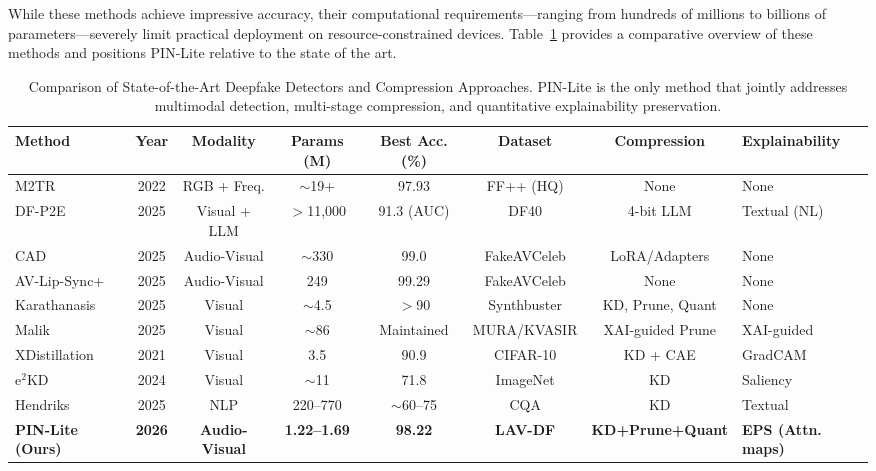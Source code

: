 \documentclass[lettersize,journal]{IEEEtran}
\begin{document}
While these methods achieve impressive accuracy, their computational requirements---ranging from hundreds of millions to billions of parameters---severely limit practical deployment on resource-constrained devices. Table~\ref{tab:literature} provides a comparative overview of these methods and positions PIN-Lite relative to the state of the art.

\begin{table}[!t]
\caption{Comparison of State-of-the-Art Deepfake Detectors and Compression Approaches. PIN-Lite is the only method that jointly addresses multimodal detection, multi-stage compression, and quantitative explainability preservation.\label{tab:literature}}
\centering
\footnotesize
\begin{tabular}{lccccccl}
\toprule
\textbf{Method} & \textbf{Year} & \textbf{Modality} & \textbf{Params (M)} & \textbf{Best Acc. (\%)} & \textbf{Dataset} & \textbf{Compression} & \textbf{Explainability} \\
\midrule
M2TR~\cite{wang2022m2tr} & 2022 & RGB + Freq. & $\sim$19+ & 97.93 & FF++ (HQ) & None & None \\
DF-P2E~\cite{tariq2025dfp2e} & 2025 & Visual + LLM & $>$11{,}000 & 91.3 (AUC) & DF40 & 4-bit LLM & Textual (NL) \\
CAD~\cite{du2025cad} & 2025 & Audio-Visual & $\sim$330 & 99.0 & FakeAVCeleb & LoRA/Adapters & None \\
AV-Lip-Sync+~\cite{shahzad2025avlipsync} & 2025 & Audio-Visual & 249 & 99.29 & FakeAVCeleb & None & None \\
Karathanasis~\cite{karathanasis2025compression} & 2025 & Visual & $\sim$4.5 & $>$90 & Synthbuster & KD, Prune, Quant & None \\
Malik~\cite{malik2025pruning} & 2025 & Visual & $\sim$86 & Maintained & MURA/KVASIR & XAI-guided Prune & XAI-guided \\
XDistillation~\cite{alharbi2021xdistillation} & 2021 & Visual & 3.5 & 90.9 & CIFAR-10 & KD + CAE & GradCAM \\
e$^2$KD~\cite{parchami2024e2kd} & 2024 & Visual & $\sim$11 & 71.8 & ImageNet & KD & Saliency \\
Hendriks~\cite{hendriks2025honey} & 2025 & NLP & 220--770 & $\sim$60--75 & CQA & KD & Textual \\
\midrule
\textbf{PIN-Lite (Ours)} & \textbf{2026} & \textbf{Audio-Visual} & \textbf{1.22--1.69} & \textbf{98.22} & \textbf{LAV-DF} & \textbf{KD+Prune+Quant} & \textbf{EPS (Attn. maps)} \\
\bottomrule
\end{tabular}
\end{table}
\end{document}
